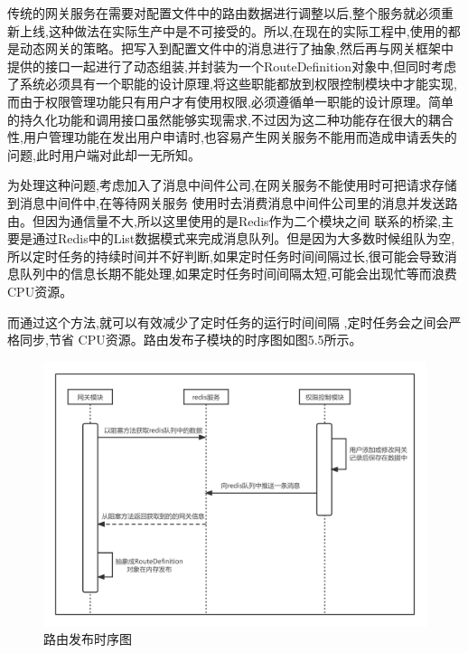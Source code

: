 

传统的网关服务在需要对配置文件中的路由数据进行调整以后,整个服务就必须重新上线,这种做法在实际生产中是不可接受的。所以,在现在的实际工程中,使用的都是动态网关的策略。把写入到配置文件中的消息进行了抽象,然后再与网关框架中提供的接口一起进行了动态组装,并封装为一个RouteDefinition对象中,但同时考虑了系统必须具有一个职能的设计原理,将这些职能都放到权限控制模块中才能实现,而由于权限管理功能只有用户才有使用权限,必须遵循单一职能的设计原理。简单的持久化功能和调用接口虽然能够实现需求,不过因为这二种功能存在很大的耦合性,用户管理功能在发出用户申请时,也容易产生网关服务不能用而造成申请丢失的问题,此时用户端对此却一无所知。

为处理这种问题,考虑加入了消息中间件公司,在网关服务不能使用时可把请求存储到消息中间件中,在等待网关服务
使用时去消费消息中间件公司里的消息并发送路由。但因为通信量不大,所以这里使用的是Redis作为二个模块之间
联系的桥梁,主要是通过Redis中的List数据模式来完成消息队列。但是因为大多数时候组队为空,所以定时任务的持续时间并不好判断,如果定时任务时间间隔过长,很可能会导致消息队列中的信息长期不能处理,如果定时任务时间间隔太短,可能会出现忙等而浪费 CPU资源。

而通过这个方法,就可以有效减少了定时任务的运行时间间隔
,定时任务会之间会严格同步,节省 CPU资源。路由发布子模块的时序图如图5.5所示。

\begin{figure}[htb]
    \centering
    \includegraphics[width=1\textwidth]{my_figures/chapter5/路由发布时序图.png}
    \caption{路由发布时序图}
    \label{fig:路由发布时序图}
\end{figure}

